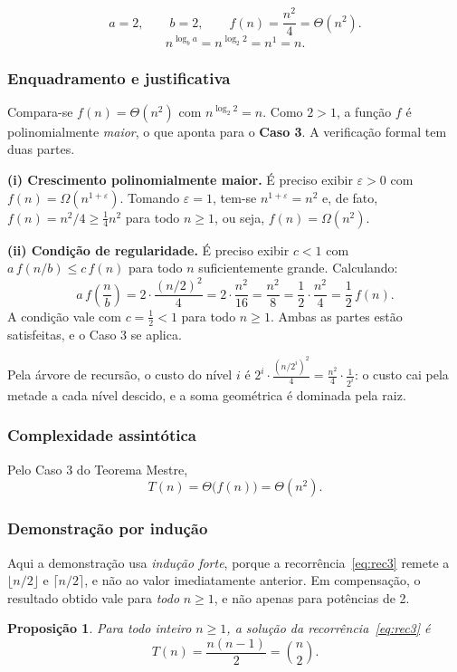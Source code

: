 \documentclass[11pt,a4paper]{article}
\newtheorem{proposicao}{Proposição}
\begin{document}
\[
a=2,\qquad b=2,\qquad f(n)=\frac{n^2}{4}=\Theta(n^2).
\]
\[
n^{\log_b a}=n^{\log_2 2}=n^{1}=n.
\]

\subsubsection{Enquadramento e justificativa}

Compara-se $f(n)=\Theta(n^2)$ com $n^{\log_2 2}=n$. Como $2>1$, a função $f$ é polinomialmente \emph{maior}, o que aponta para o \textbf{Caso 3}. A verificação formal tem duas partes.

\textbf{(i) Crescimento polinomialmente maior.} É preciso exibir $\varepsilon>0$ com $f(n)=\Omega\!\left(n^{1+\varepsilon}\right)$. Tomando $\varepsilon=1$, tem-se $n^{1+\varepsilon}=n^2$ e, de fato, $f(n)=n^2/4\ge\frac14 n^2$ para todo $n\ge1$, ou seja, $f(n)=\Omega(n^2)$.

\textbf{(ii) Condição de regularidade.} É preciso exibir $c<1$ com $a\,f(n/b)\le c\,f(n)$ para todo $n$ suficientemente grande. Calculando:
\[
a\,f\!\left(\frac nb\right)=2\cdot\frac{(n/2)^2}{4}=2\cdot\frac{n^2}{16}=\frac{n^2}{8}=\frac12\cdot\frac{n^2}{4}=\frac12\,f(n).
\]
A condição vale com $c=\tfrac12<1$ para todo $n\ge1$. Ambas as partes estão satisfeitas, e o Caso 3 se aplica.

Pela árvore de recursão, o custo do nível $i$ é $2^i\cdot\frac{(n/2^i)^2}{4}=\frac{n^2}{4}\cdot\frac{1}{2^i}$: o custo cai pela metade a cada nível descido, e a soma geométrica é dominada pela raiz.

\subsubsection{Complexidade assintótica}

Pelo Caso 3 do Teorema Mestre,
\[
\boxed{T(n)=\Theta\big(f(n)\big)=\Theta\!\left(n^2\right).}
\]

\subsubsection{Demonstração por indução}

Aqui a demonstração usa \emph{indução forte}, porque a recorrência~\eqref{eq:rec3} remete a $\lfloor n/2\rfloor$ e $\lceil n/2\rceil$, e não ao valor imediatamente anterior. Em compensação, o resultado obtido vale para \emph{todo} $n\ge1$, e não apenas para potências de 2.

\begin{proposicao}
\label{prop:p3}
Para todo inteiro $n\ge1$, a solução da recorrência~\eqref{eq:rec3} é
\[
T(n)=\frac{n(n-1)}{2}=\binom{n}{2}.
\]
\end{proposicao}
\end{document}
